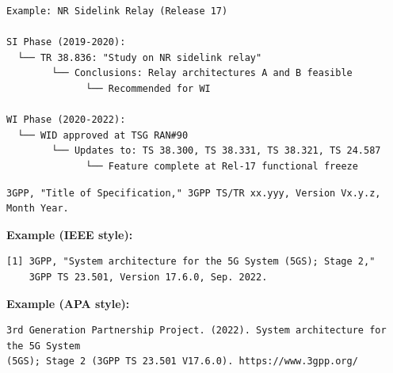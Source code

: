 
\def\CNcodelang{}

\begin{CNplaincode}
\begin{Verbatim}
Example: NR Sidelink Relay (Release 17)

SI Phase (2019-2020):
  └── TR 38.836: "Study on NR sidelink relay"
        └── Conclusions: Relay architectures A and B feasible
              └── Recommended for WI

WI Phase (2020-2022):
  └── WID approved at TSG RAN#90
        └── Updates to: TS 38.300, TS 38.331, TS 38.321, TS 24.587
              └── Feature complete at Rel-17 functional freeze
\end{Verbatim}
\end{CNplaincode}



\CNchained{}

\def\CNcodelang{}

\begin{CNplaincode}
\begin{Verbatim}
3GPP, "Title of Specification," 3GPP TS/TR xx.yyy, Version Vx.y.z, Month Year.
\end{Verbatim}
\end{CNplaincode}

\textbf{Example (IEEE style):}

\def\CNcodelang{}

\begin{CNplaincode}
\begin{Verbatim}
[1] 3GPP, "System architecture for the 5G System (5GS); Stage 2,"
    3GPP TS 23.501, Version 17.6.0, Sep. 2022.
\end{Verbatim}
\end{CNplaincode}

\textbf{Example (APA style):}

\def\CNcodelang{}

\begin{CNplaincode}
\begin{Verbatim}
3rd Generation Partnership Project. (2022). System architecture for the 5G System
(5GS); Stage 2 (3GPP TS 23.501 V17.6.0). https://www.3gpp.org/
\end{Verbatim}
\end{CNplaincode}

